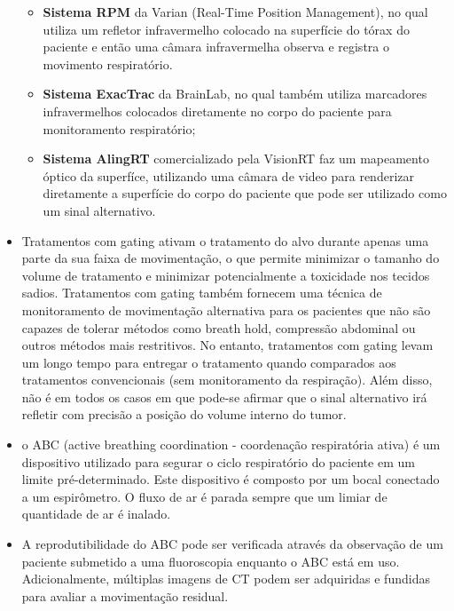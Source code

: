 \documentclass[11pt,a4paper]{article}
\newcounter{exemplo}
\begin{document}
\begin{exemplo}
\begin{itemize}
            \begin{itemize}[label=\textcolor{CarnationPink}{$\blacktriangleright$}]
                \item \textbf{Sistema RPM} da Varian (Real-Time Position Management), no qual utiliza um refletor infravermelho colocado na superfície do tórax do paciente e então uma câmara infravermelha observa e registra o movimento respiratório.
                \item \textbf{Sistema ExacTrac} da BrainLab, no qual também utiliza marcadores infravermelhos colocados diretamente no corpo do paciente para monitoramento respiratório;
                \item \textbf{Sistema AlingRT} comercializado pela VisionRT faz um mapeamento óptico da superfíce, utilizando uma câmara de video para renderizar diretamente a superfície do corpo do paciente que pode ser utilizado como um sinal alternativo. 
            \end{itemize}
        
        \item Tratamentos com gating ativam o tratamento do alvo durante apenas uma parte da sua faixa de movimentação, o que permite minimizar o tamanho do volume de tratamento e minimizar potencialmente a toxicidade nos tecidos sadios. Tratamentos com gating também fornecem uma técnica de monitoramento de movimentação alternativa para os pacientes que não são capazes de tolerar métodos como breath hold, compressão abdominal ou outros métodos mais restritivos. No entanto, tratamentos com gating levam um longo tempo para entregar o tratamento quando comparados aos tratamentos convencionais (sem monitoramento da respiração). Além disso, não é em todos os casos em que pode-se afirmar que o sinal alternativo irá refletir com precisão a posição do volume interno do tumor.
        
        \item o ABC (active breathing coordination - coordenação respiratória ativa) é um dispositivo utilizado para segurar o ciclo respiratório do paciente em um limite pré-determinado. Este dispositivo é composto por um bocal conectado a um espirômetro. O fluxo de ar é parada sempre que um limiar de quantidade de ar é inalado.
        
        \item A reprodutibilidade do ABC pode ser verificada através da observação de um paciente submetido a uma fluoroscopia enquanto o ABC está em uso. Adicionalmente, múltiplas imagens de CT podem ser adquiridas e fundidas para avaliar a movimentação residual.
        

\end{itemize}
\end{exemplo}
\end{document}
